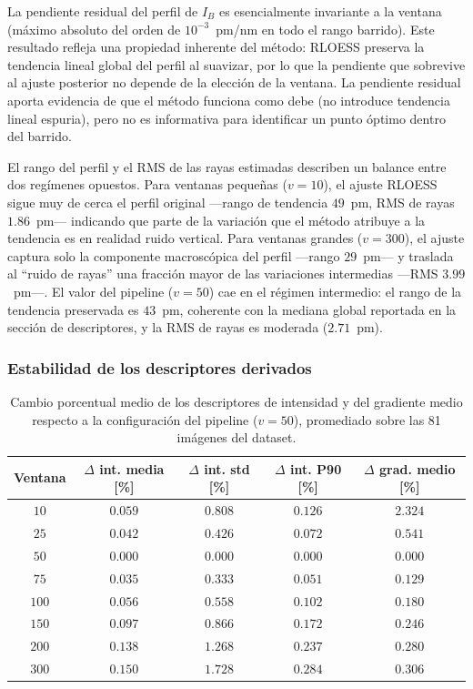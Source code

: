 La pendiente residual del perfil de $I_B$ es esencialmente invariante a la ventana (máximo absoluto del orden de $10^{-3}$~pm/nm en todo el rango barrido). Este resultado refleja una propiedad inherente del método: RLOESS preserva la tendencia lineal global del perfil al suavizar, por lo que la pendiente que sobrevive al ajuste posterior no depende de la elección de la ventana. La pendiente residual aporta evidencia de que el método funciona como debe (no introduce tendencia lineal espuria), pero no es informativa para identificar un punto óptimo dentro del barrido.
 
El rango del perfil y el RMS de las rayas estimadas describen un balance entre dos regímenes opuestos. Para ventanas pequeñas ($v=10$), el ajuste RLOESS sigue muy de cerca el perfil original ---rango de tendencia $49$~pm, RMS de rayas $1.86$~pm--- indicando que parte de la variación que el método atribuye a la tendencia es en realidad ruido vertical. Para ventanas grandes ($v=300$), el ajuste captura solo la componente macroscópica del perfil ---rango $29$~pm--- y traslada al ``ruido de rayas'' una fracción mayor de las variaciones intermedias ---RMS $3.99$~pm---. El valor del pipeline ($v=50$) cae en el régimen intermedio: el rango de la tendencia preservada es $43$~pm, coherente con la mediana global reportada en la sección de descriptores, y la RMS de rayas es moderada ($2.71$~pm).
 
\subsubsection*{Estabilidad de los descriptores derivados}
 
\begin{table}[H]
\centering
\caption{Cambio porcentual medio de los descriptores de intensidad y del gradiente medio respecto a la configuración del pipeline ($v=50$), promediado sobre las 81 imágenes del dataset.}
\label{tab:rloess_estabilidad}
\small
\begin{tabular}{ccccc}
\toprule
\textbf{Ventana} & \textbf{$\Delta$ int. media [\%]} & \textbf{$\Delta$ int. std [\%]} & \textbf{$\Delta$ int. P90 [\%]} & \textbf{$\Delta$ grad. medio [\%]} \\
\midrule
$10$  & $0.059$ & $0.808$ & $0.126$ & $2.324$ \\
$25$  & $0.042$ & $0.426$ & $0.072$ & $0.541$ \\
$50$  & $0.000$ & $0.000$ & $0.000$ & $0.000$ \\
$75$  & $0.035$ & $0.333$ & $0.051$ & $0.129$ \\
$100$ & $0.056$ & $0.558$ & $0.102$ & $0.180$ \\
$150$ & $0.097$ & $0.866$ & $0.172$ & $0.246$ \\
$200$ & $0.138$ & $1.268$ & $0.237$ & $0.280$ \\
$300$ & $0.150$ & $1.728$ & $0.284$ & $0.306$ \\
\bottomrule
\end{tabular}
\end{table}
 
